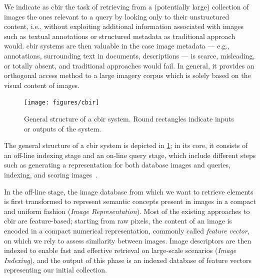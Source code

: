 We indicate as \acrfull{cbir} the task of retrieving from a (potentially large) collection of images the ones relevant to a query by looking only to their unstructured content, i.e., without exploiting additional information associated with images such as textual annotations or structured metadata as traditional approach would.
\gls{cbir} systems are then valuable in the case image metadata --- e.g., annotations, surrounding text in documents, descriptions --- is scarce, misleading, or totally absent, and traditional approaches would fail.
In general, it provides an orthogonal access method to a large imagery corpus which is solely based on the visual content of images.

\begin{figure}
    \texttt{[image: figures/cbir]}
    \caption{General structure of a \acrfull{cbir} system. Round rectangles indicate inputs or outputs of the system.}
    \label{fig:back:cbir}
\end{figure}
The general structure of a \gls{cbir} system is depicted in \ref{fig:back:cbir};
in its core, it consists of an off-line indexing stage and an on-line query stage, which include different steps such as generating a representation for both database images and queries, indexing, and scoring images~\cite{zhou2017recent}.

In the off-line stage, the image database from which we want to retrieve elements is first transformed to represent semantic concepts present in images in a compact and uniform fashion (\emph{Image Representation}).
Most of the existing approaches to \gls{cbir} are feature-based;
starting from raw pixels, the content of an image is encoded in a compact numerical representation, commonly called \emph{feature vector}, on which we rely to assess similarity between images.
Image descriptors are then indexed to enable fast and effective retrieval on large-scale scenarios (\emph{Image Indexing}), and the output of this phase is an indexed database of feature vectors representing our initial collection.

